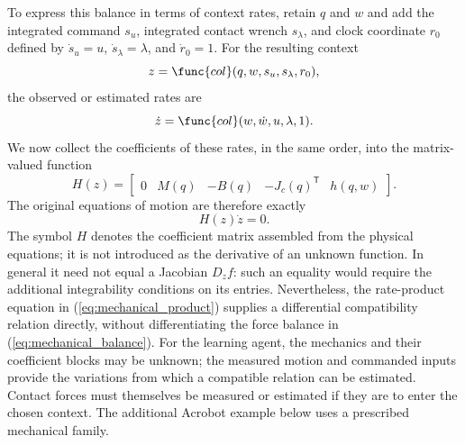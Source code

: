 To express this balance in terms of context rates, retain $q$ and $w$ and
add the integrated command $s_u$, integrated contact wrench $s_\lambda$, and
clock coordinate $r_0$ defined by $\dot s_u=u$, $\dot s_\lambda=\lambda$,
and $\dot r_0=1$. For the resulting context 
\begin{equation}
z=\func{col}(q,w,s_u,s_\lambda,r_0),  \label{eq:mechanical_context}
\end{equation}
the observed or estimated rates are 
\begin{equation}
\dot z=\func{col}(w,\dot w,u,\lambda,1).  \label{eq:mechanical_rates}
\end{equation}
We now collect the coefficients of these rates, in the same order, into the
matrix-valued function 
\begin{equation}
H(z)=%
\begin{bmatrix}
0 & M(q) & -B(q) & -J_c(q)^{\mathsf{T}} & h(q,w)%
\end{bmatrix}%
.  \label{eq:mechanical_coefficients}
\end{equation}
The original equations of motion are therefore exactly 
\begin{equation}
H(z)\dot z=0.  \label{eq:mechanical_product}
\end{equation}
The symbol $H$ denotes the coefficient matrix assembled from the physical
equations; it is not introduced as the derivative of an unknown function. In
general it need not equal a Jacobian $D_zf$: such an equality would require
the additional integrability conditions on its entries. Nevertheless, the
rate-product equation in (\ref{eq:mechanical_product}) supplies a
differential compatibility relation directly, without differentiating the
force balance in (\ref{eq:mechanical_balance}). For the learning agent, the
mechanics and their coefficient blocks may be unknown; the measured motion
and commanded inputs provide the variations from which a compatible relation
can be estimated. Contact forces must themselves be measured or estimated if
they are to enter the chosen context. The additional Acrobot example below uses a prescribed mechanical family.

